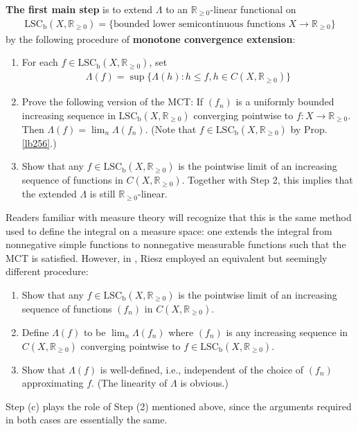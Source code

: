 \documentclass[12pt,b5paper,notitlepage]{article}
\theoremstyle{definition}
\theoremstyle{plain}
\newcommand{\Rbb}{\mathbb R}
\newcommand{\LSCb}{\mathrm{LSC}_{\mathrm b}}
\numberwithin{equation}{section}
\begin{document}
\textbf{The first main step} is to extend $\Lambda$ to an $\Rbb_{\geq0}$-linear functional on \index{LSCb@$\LSCb(X,\Rbb_{\geq0})$}
\begin{align}\label{eq162}
\LSCb(X,\Rbb_{\geq0})=\{\text{bounded lower semicontinuous functions }X\rightarrow\Rbb_{\geq0}\}
\end{align}
by the following procedure of \textbf{monotone convergence extension}:
\begin{enumerate}[label=(\arabic*)]
\item For each $f\in\LSCb(X,\Rbb_{\geq0})$, set
\begin{align*}
\Lambda(f)=\sup\{\Lambda(h):h\leq f,h\in C(X,\Rbb_{\geq0})\}
\end{align*}
\item Prove the following version of the MCT: If $(f_n)$ is a uniformly bounded increasing sequence in $\LSCb(X,\Rbb_{\geq0})$ converging pointwise to $f:X\rightarrow\Rbb_{\geq0}$. Then $\Lambda(f)=\lim_n\Lambda(f_n)$. (Note that $f\in\LSCb(X,\Rbb_{\geq0})$ by Prop. \ref{lb256}.)
\item Show that any $f\in\LSCb(X,\Rbb_{\geq0})$ is the pointwise limit of an increasing sequence of functions in $C(X,\Rbb_{\geq0})$. Together with Step 2, this implies that the extended $\Lambda$ is still $\Rbb_{\geq0}$-linear.
\end{enumerate}


Readers familiar with measure theory will recognize that this is the same method used to define the integral on a measure space: one extends the integral from nonnegative simple functions to nonnegative measurable functions such that the MCT is satisfied. However, in \cite{Rie13,Rie14}, Riesz employed an equivalent but seemingly different procedure:
\begin{enumerate}[label=(\alph*)]
\item Show that any $f\in\LSCb(X,\Rbb_{\geq0})$ is the pointwise limit of an increasing sequence of functions $(f_n)$ in $C(X,\Rbb_{\geq0})$.
\item Define $\Lambda(f)$ to be $\lim_n\Lambda(f_n)$ where $(f_n)$ is any increasing sequence in $C(X,\Rbb_{\geq0})$ converging pointwise to $f\in\LSCb(X,\Rbb_{\geq0})$.
\item Show that $\Lambda(f)$ is well-defined, i.e., independent of the choice of $(f_n)$ approximating $f$. (The linearity of $\Lambda$ is obvious.)
\end{enumerate}
Step (c) plays the role of Step (2) mentioned above, since the arguments required in both cases are essentially the same.
\end{document}

